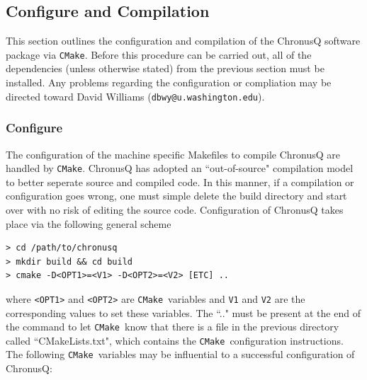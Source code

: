 \documentclass[12pt]{article}
\makeatletter
\newcommand{\DBWYContact}{David Williams (\texttt{dbwy@u.washington.edu})}
\newcommand{\CMake}{\texttt{CMake}}
\makeatother
\begin{document}
    \subsection{Configure and Compilation} \label{subsec:ChronusQConfigCompile}
    
    This section outlines the configuration and compilation of the ChronusQ
    software package via \CMake. Before this procedure can be carried out,
    all of the dependencies (unless otherwise stated) from the previous section
    must be installed. Any problems regarding the configuration or compliation
    may be directed toward \DBWYContact.

    \subsubsection{Configure} \label{subsubsec:ChronusQConfig}

    The configuration of the machine specific Makefiles to compile ChronusQ are
    handled by \CMake. ChronusQ has adopted an ``out-of-source" compilation model
    to better seperate source and compiled code. In this manner, if a compilation
    or configuration goes wrong, one must simple delete the build directory and 
    start over with no risk of editing the source code. Configuration of ChronusQ
    takes place via the following general scheme
    
    \begin{lstlisting}
> cd /path/to/chronusq
> mkdir build && cd build
> cmake -D<OPT1>=<V1> -D<OPT2>=<V2> [ETC] ..
    \end{lstlisting}

    \noindent where \texttt{<OPT1>} and \texttt{<OPT2>} are \CMake~variables 
    and \texttt{V1} and \texttt{V2} are the corresponding values to set these 
    variables. The ``.." must be present at the end of the command to let 
    \CMake~know that there is a file in the previous directory called 
    ``CMakeLists.txt", which contains the \CMake~configuration instructions. The 
    following \CMake~variables may be influential to a successful configuration of 
    ChronusQ:
\end{document}
